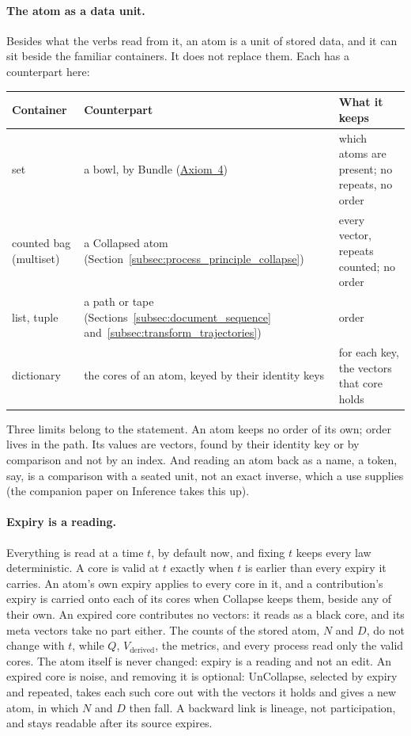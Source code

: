 \documentclass[12pt, a4paper]{article}
\begin{document}
\paragraph{The atom as a data unit.} Besides what the verbs read from it, an atom is a unit of stored data, and it can sit beside the familiar containers. It does not replace them. Each has a counterpart here:
\begin{center}
\small
\begin{tabular}{@{}p{2.6cm}p{5.6cm}p{6.2cm}@{}}
\hline
Container & Counterpart & What it keeps \\ \hline
set & a bowl, by Bundle (\hyperref[subsec:axiom_idempotence]{Axiom~4}) & which atoms are present; no repeats, no order \\
counted bag (multiset) & a Collapsed atom (Section~\ref{subsec:process_principle_collapse}) & every vector, repeats counted; no order \\
list, tuple & a path or tape (Sections~\ref{subsec:document_sequence} and~\ref{subsec:transform_trajectories}) & order \\
dictionary & the cores of an atom, keyed by their identity keys & for each key, the vectors that core holds \\ \hline
\end{tabular}
\end{center}
Three limits belong to the statement. An atom keeps no order of its own; order lives in the path. Its values are vectors, found by their identity key or by comparison and not by an index. And reading an atom back as a name, a token, say, is a comparison with a seated unit, not an exact inverse, which a use supplies (the companion paper on Inference takes this up).

\paragraph{Expiry is a reading.} Everything is read at a time $t$, by
default now, and fixing $t$ keeps every law deterministic. A core is
valid at $t$ exactly when $t$ is earlier than every expiry it carries. An
atom's own expiry applies to every core in it, and a contribution's
expiry is carried onto each of its cores when Collapse keeps them,
beside any of their own. An expired core contributes no vectors: it
reads as a black core, and its meta vectors take no part either. The
counts of the stored atom, $N$ and $D$, do not change with $t$, while
$Q$, $V_{\text{derived}}$, the metrics, and every process read only the
valid cores. The atom itself is never changed: expiry is a reading and not an edit. An expired core is noise, and removing it is optional: UnCollapse, selected by expiry and repeated, takes each such core out with the vectors it holds and gives a new atom, in which $N$ and $D$ then fall. A backward link is lineage, not participation, and stays
readable after its source expires.
\end{document}
